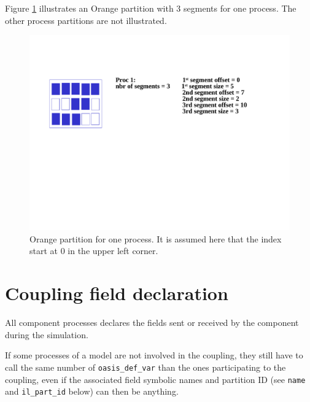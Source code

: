 Figure \ref{orange_partition} illustrates an Orange partition with 3
segments for one process. The other process partitions are not
illustrated.

\begin{figure}
  \includegraphics[scale=.6]{figures/orange_new}
  \caption{Orange partition for one process. It is assumed here that
    the index start at 0 in the upper left corner.}
  \label{orange_partition}
\end{figure}


\section{Coupling field declaration}
\label{subsubsec_Declaration}

All component processes declares the fields sent or received by the
component during the simulation.
 
If some processes of a model are not involved in the coupling, they
still have to call the same number of {\tt oasis\_def\_var} than the
ones participating to the coupling, even if the associated field
symbolic names and partition ID (see {\tt name} and {\tt il\_part\_id}
below) can then be anything.

